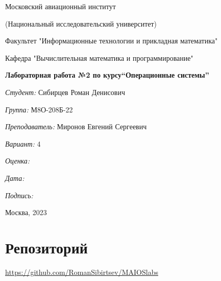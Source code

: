 \documentclass[a4paper, 12pt]{article}
\begin{document}
\thispagestyle{empty}	
\begin{center}
	Московский авиационный институт
	
	(Национальный исследовательский университет)
	
	Факультет "Информационные технологии и прикладная математика"
	
	Кафедра "Вычислительная математика и программирование"
	
\end{center}
\vspace{40ex}
\begin{center}
	\textbf{\large{Лабораторная работа №2 по курсу\linebreak \textquotedblleft Операционные системы\textquotedblright}}
\end{center}
\vspace{35ex}
\begin{flushright}
	\textit{Студент: } Сибирцев Роман Денисович
	
	\vspace{2ex}
	\textit{Группа: } М8О-208Б-22
	
	\vspace{2ex}
	\textit{Преподаватель: } Миронов Евгений Сергеевич
	
	\vspace{2ex}
	\textit{Вариант: } 4
	
	\vspace{2ex}
	\textit{Оценка: } \underline{\quad\quad\quad\quad\quad\quad}
	
	 \vspace{2ex}
	\textit{Дата: } \underline{\quad\quad\quad\quad\quad\quad}
	
	\vspace{2ex}
	\textit{Подпись: } \underline{\quad\quad\quad\quad\quad\quad}
	
\end{flushright}

\vspace{5ex}

\begin{vfill}
	\begin{center}
		Москва, 2023
	\end{center}	
\end{vfill}
\newpage


\begingroup
\color{black}
\tableofcontents\newpage
\endgroup

\section{Репозиторий}
\href{https://github.com/RomanSibirtsev/MAI_OS_labs}{https://github.com/RomanSibirtsev/MAIOSlabs}
\end{document}
